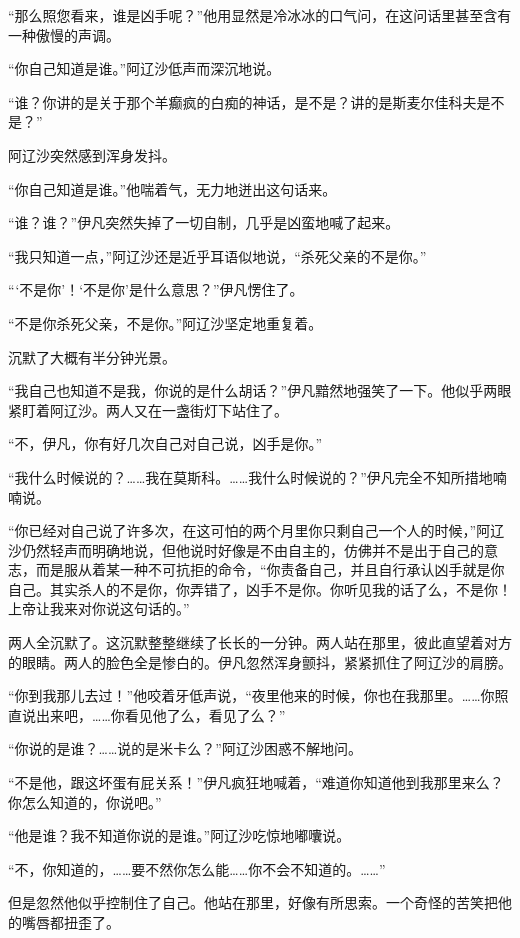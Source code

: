 \par “那么照您看来，谁是凶手呢？”他用显然是冷冰冰的口气问，在这问话里甚至含有一种傲慢的声调。
\par “你自己知道是谁。”阿辽沙低声而深沉地说。
\par “谁？你讲的是关于那个羊癫疯的白痴的神话，是不是？讲的是斯麦尔佳科夫是不是？”
\par 阿辽沙突然感到浑身发抖。
\par “你自己知道是谁。”他喘着气，无力地迸出这句话来。
\par “谁？谁？”伊凡突然失掉了一切自制，几乎是凶蛮地喊了起来。
\par “我只知道一点，”阿辽沙还是近乎耳语似地说，“杀死父亲的不是你。”
\par “‘不是你’！‘不是你’是什么意思？”伊凡愣住了。
\par “不是你杀死父亲，不是你。”阿辽沙坚定地重复着。
\par 沉默了大概有半分钟光景。
\par “我自己也知道不是我，你说的是什么胡话？”伊凡黯然地强笑了一下。他似乎两眼紧盯着阿辽沙。两人又在一盏街灯下站住了。
\par “不，伊凡，你有好几次自己对自己说，凶手是你。”
\par “我什么时候说的？……我在莫斯科。……我什么时候说的？”伊凡完全不知所措地喃喃说。
\par “你已经对自己说了许多次，在这可怕的两个月里你只剩自己一个人的时候，”阿辽沙仍然轻声而明确地说，但他说时好像是不由自主的，仿佛并不是出于自己的意志，而是服从着某一种不可抗拒的命令，“你责备自己，并且自行承认凶手就是你自己。其实杀人的不是你，你弄错了，凶手不是你。你听见我的话了么，不是你！上帝让我来对你说这句话的。”
\par 两人全沉默了。这沉默整整继续了长长的一分钟。两人站在那里，彼此直望着对方的眼睛。两人的脸色全是惨白的。伊凡忽然浑身颤抖，紧紧抓住了阿辽沙的肩膀。
\par “你到我那儿去过！”他咬着牙低声说，“夜里他来的时候，你也在我那里。……你照直说出来吧，……你看见他了么，看见了么？”
\par “你说的是谁？……说的是米卡么？”阿辽沙困惑不解地问。
\par “不是他，跟这坏蛋有屁关系！”伊凡疯狂地喊着，“难道你知道他到我那里来么？你怎么知道的，你说吧。”
\par “他是谁？我不知道你说的是谁。”阿辽沙吃惊地嘟囔说。
\par “不，你知道的，……要不然你怎么能……你不会不知道的。……”
\par 但是忽然他似乎控制住了自己。他站在那里，好像有所思索。一个奇怪的苦笑把他的嘴唇都扭歪了。

